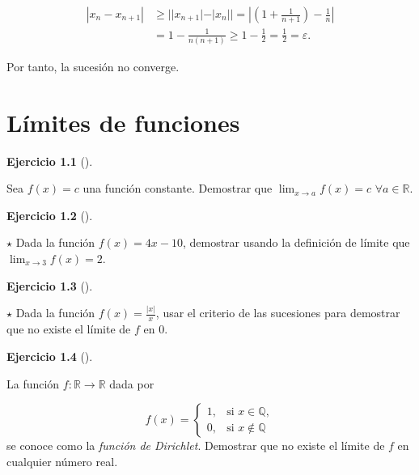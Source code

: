 \documentclass[
  a4paper,
]{scrreport}
\theoremstyle{definition}
\newtheorem{exercise}{Ejercicio}[chapter]
\theoremstyle{remark}
\begin{document}
\begin{tcolorbox}
\begin{align*}
|x_n-x_{n+1}| &\geq ||x_{n+1}|-|x_n|| =\left|\left(1+\frac{1}{n+1}\right)-\frac{1}{n}\right|\\ 
&=1-\frac{1}{n(n+1)}\geq 1 -\frac{1}{2} = \frac{1}{2}=\varepsilon.
\end{align*}

Por tanto, la sucesión no converge.

\end{tcolorbox}


\hypertarget{luxedmites-de-funciones}{%
\chapter{Límites de funciones}\label{luxedmites-de-funciones}}

\leavevmode{}%
\begin{exercise}[]\label{exr-funcion-constante}

Sea \(f(x)=c\) una función constante. Demostrar que
\(\lim_{x\to a}f(x)=c\) \(\forall a\in\mathbb{R}\).

\end{exercise}

\leavevmode{}%
\begin{exercise}[]\label{exr-definicion-limite}

\(\star\) Dada la función \(f(x)=4x-10\), demostrar usando la definición
de límite que \(\lim_{x\to 3}f(x)=2\).

\end{exercise}

\leavevmode{}%
\begin{exercise}[]\label{exr-limite-criterio-sucesiones}

\(\star\) Dada la función \(f(x)=\frac{|x|}{x}\), usar el criterio de
las sucesiones para demostrar que no existe el límite de \(f\) en \(0\).

\end{exercise}

\leavevmode{}%
\begin{exercise}[]\label{exr-limite-funcion-Dirichlet}

La función \(f:\mathbb{R}\to \mathbb{R}\) dada por

\[
f(x)=\begin{cases}
1, & \mbox{si } x\in\mathbb{Q},\\ 
0, & \mbox{si } x\not\in \mathbb{Q}
\end{cases}
\] se conoce como la \emph{función de Dirichlet}. Demostrar que no
existe el límite de \(f\) en cualquier número real.

\end{exercise}
\end{document}
